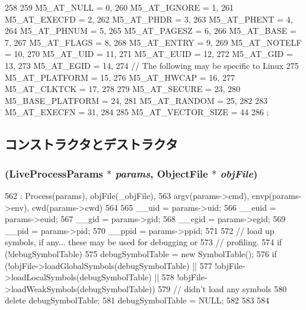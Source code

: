 \begin{DoxyCode}
258                              {
259         M5_AT_NULL = 0,
260         M5_AT_IGNORE = 1,
261         M5_AT_EXECFD = 2,
262         M5_AT_PHDR = 3,
263         M5_AT_PHENT = 4,
264         M5_AT_PHNUM = 5,
265         M5_AT_PAGESZ = 6,
266         M5_AT_BASE = 7,
267         M5_AT_FLAGS = 8,
268         M5_AT_ENTRY = 9,
269         M5_AT_NOTELF = 10,
270         M5_AT_UID = 11,
271         M5_AT_EUID = 12,
272         M5_AT_GID = 13,
273         M5_AT_EGID = 14,
274         // The following may be specific to Linux
275         M5_AT_PLATFORM = 15,
276         M5_AT_HWCAP = 16,
277         M5_AT_CLKTCK = 17,
278 
279         M5_AT_SECURE = 23,
280         M5_BASE_PLATFORM = 24,
281         M5_AT_RANDOM = 25,
282 
283         M5_AT_EXECFN = 31,
284 
285         M5_AT_VECTOR_SIZE = 44
286     };
\end{DoxyCode}


\subsection{コンストラクタとデストラクタ}
\hypertarget{classLiveProcess_ab066d499d8c28173dc600ff40954e5ea}{
\subsubsection[{LiveProcess}]{ (LiveProcessParams $\ast$ {\em params}, \/  {\bf ObjectFile} $\ast$ {\em objFile})}}
\label{classLiveProcess_ab066d499d8c28173dc600ff40954e5ea}



\begin{DoxyCode}
562     : Process(params), objFile(_objFile),
563       argv(params->cmd), envp(params->env), cwd(params->cwd)
564 {
565     __uid = params->uid;
566     __euid = params->euid;
567     __gid = params->gid;
568     __egid = params->egid;
569     __pid = params->pid;
570     __ppid = params->ppid;
571 
572     // load up symbols, if any... these may be used for debugging or
573     // profiling.
574     if (!debugSymbolTable) {
575         debugSymbolTable = new SymbolTable();
576         if (!objFile->loadGlobalSymbols(debugSymbolTable) ||
577             !objFile->loadLocalSymbols(debugSymbolTable) ||
578             !objFile->loadWeakSymbols(debugSymbolTable)) {
579             // didn't load any symbols
580             delete debugSymbolTable;
581             debugSymbolTable = NULL;
582         }
583     }
584 }
\end{DoxyCode}


